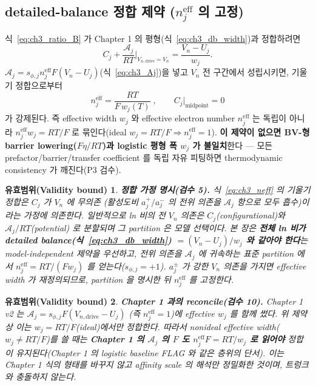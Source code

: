 \documentclass[11pt,a4paper]{article}
\newtheorem*{boundbox}{유효범위(Validity bound)}
\newcommand{\eff}{\mathrm{eff}}
\newcommand{\drive}{\mathrm{drive}}
\begin{document}
\subsection{detailed-balance 정합 제약 ($n_j^{\eff}$ 의 고정)}\label{sec:ch3_neff}
식~\eqref{eq:ch3_ratio_B} 가 Chapter 1 의 평형(식~\eqref{eq:ch3_db_width})과 정합하려면
\begin{equation}
C_j+\frac{\mathcal A_j}{RT}\Big|_{V_{n,\drive}=V_n}=\frac{V_n-U_j}{w_j}.
\label{eq:ch3_dbmatch}
\end{equation}
$\mathcal A_j=s_{\phi,j}n_j^{\eff}F(V_n-U_j)$(식~\eqref{eq:ch3_Aj})을 넣고 $V_n$ 전 구간에서 성립시키면, 기울기
정합으로부터
\begin{equation}
\boxed{\;n_j^{\eff}=\frac{RT}{F\,w_j(T)}\;,\qquad C_j\big|_{\text{midpoint}}=0\;}
\label{eq:ch3_neff}
\end{equation}
가 강제된다. 즉 effective width $w_j$ 와 effective electron number $n_j^{\eff}$ 는 독립이 아니라
$n_j^{\eff}w_j=RT/F$ 로 묶인다(ideal $w_j=RT/F\Rightarrow n_j^{\eff}=1$). \textbf{이 제약이 없으면 BV-형
barrier lowering($Fη/RT$)과 logistic 평형 폭 $w_j$ 가 불일치}한다 — 모든 prefactor/barrier/transfer
coefficient 를 독립 자유 피팅하면 thermodynamic consistency 가 깨진다(P3 검수).
\begin{boundbox}
\textbf{정합 가정 명시(검수 5).} 식~\eqref{eq:ch3_neff} 의 기울기 정합은 \emph{$C_j$ 가 $V_n$ 에 무의존}
(활성도비 $a_j^+/a_j^-$ 의 전위 의존을 $\mathcal A_j$ 항으로 모두 흡수)이라는 가정에 의존한다. 일반적으로
ln 비의 전 $V_n$ 의존은 $C_j$(configurational)와 $\mathcal A_j/RT$(potential) 로 분할되며 그 partition 은
모델 선택이다. 본 장은 \textbf{전체 ln 비가 detailed balance(식~\eqref{eq:ch3_db_width}) $=(V_n-U_j)/w_j$ 와
같아야 한다}는 model-independent 제약을 우선하고, 전위 의존을 $\mathcal A_j$ 에 귀속하는 표준 partition 에서
$n_j^{\eff}=RT/(Fw_j)$ 를 얻는다($s_{\phi,j}=+1$). $a_j^\pm$ 가 강한 $V_n$ 의존을 가지면 effective width 가
재정의되므로, partition 을 명시한 뒤 $n_j^{\eff}$ 를 고정한다.
\end{boundbox}
\begin{boundbox}
\textbf{Chapter 1 과의 reconcile(검수 10).} Chapter 1 v2 는 $\mathcal A_j=s_{\phi,j}F(V_{n,\drive}-U_j)$
(즉 $n_j^{\eff}=1$)에 \emph{effective} $w_j$ 를 함께 썼다. 위 제약상 이는 $w_j=RT/F$(ideal)에서만 정합한다.
따라서 nonideal effective width($w_j\ne RT/F$)를 쓸 때는 \textbf{Chapter 1 의 $\mathcal A_j$ 의 $F$ 도
$n_j^{\eff}F=RT/w_j$ 로 읽어야} 정합이 유지된다(Chapter 1 의 logistic baseline FLAG 와 같은 층위의 단서).
이는 Chapter 1 식의 형태를 바꾸지 않고 affinity scale 의 해석만 정밀화한 것이며, 트렁크와 충돌하지 않는다.
\end{boundbox}
\end{document}
